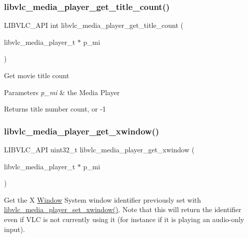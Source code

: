 \subsubsection{\texorpdfstring{libvlc\+\_\+media\+\_\+player\+\_\+get\+\_\+title\+\_\+count()}{libvlc\_media\_player\_get\_title\_count()}}
{\footnotesize\ttfamily L\+I\+B\+V\+L\+C\+\_\+\+A\+PI int libvlc\+\_\+media\+\_\+player\+\_\+get\+\_\+title\+\_\+count (\begin{DoxyParamCaption}\item[{libvlc\+\_\+media\+\_\+player\+\_\+t $\ast$}]{p\+\_\+mi }\end{DoxyParamCaption})}

Get movie title count


\begin{DoxyParams}{Parameters}
{\em p\+\_\+mi} & the Media Player \\
\hline
\end{DoxyParams}
\begin{DoxyReturn}{Returns}
title number count, or -\/1 
\end{DoxyReturn}
\mbox{\label{group__libvlc__media__player_gac0ccdaeef127b62ce26adfa195f0bba1}} 
\subsubsection{\texorpdfstring{libvlc\+\_\+media\+\_\+player\+\_\+get\+\_\+xwindow()}{libvlc\_media\_player\_get\_xwindow()}}
{\footnotesize\ttfamily L\+I\+B\+V\+L\+C\+\_\+\+A\+PI uint32\+\_\+t libvlc\+\_\+media\+\_\+player\+\_\+get\+\_\+xwindow (\begin{DoxyParamCaption}\item[{libvlc\+\_\+media\+\_\+player\+\_\+t $\ast$}]{p\+\_\+mi }\end{DoxyParamCaption})}

Get the X \hyperlink{classWindow}{Window} System window identifier previously set with \hyperlink{group__libvlc__media__player_ga31827df3a665a72410cb95695147ba5b}{libvlc\+\_\+media\+\_\+player\+\_\+set\+\_\+xwindow()}. Note that this will return the identifier even if V\+LC is not currently using it (for instance if it is playing an audio-\/only input).


